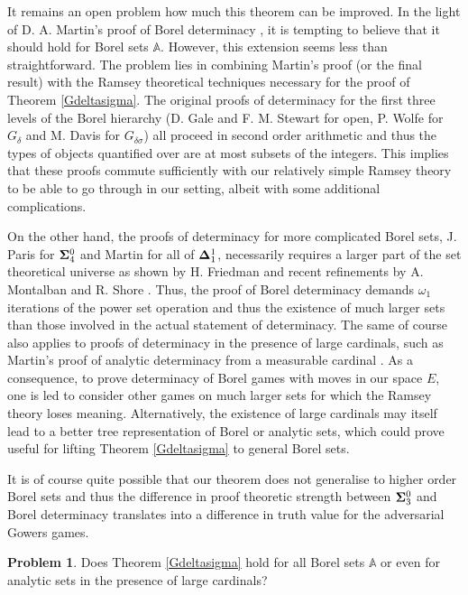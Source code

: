 \documentclass[10pt]{amsart}
\newcommand {\A}{\mathbb A}
\newcommand{\om}{\omega}
\theoremstyle{definition}
\newtheorem{prob}[thm]{Problem}
\begin{document}
It remains an open problem how much  this theorem can be improved. In the light of D. A. Martin's proof of Borel determinacy \cite{martin1,martin2}, it is tempting to believe that it should hold for Borel sets $\A$. However, this extension seems less than straightforward. The problem lies in combining Martin's proof (or the final result) with the Ramsey theoretical techniques necessary for the proof of Theorem \ref{Gdeltasigma}. The original proofs of determinacy for the first three levels of the Borel hierarchy  (D. Gale and F. M. Stewart \cite{gale} for open, P. Wolfe \cite{wolfe} for $G_\delta$ and M. Davis \cite{davis} for $G_{\delta\sigma}$) all proceed in second order arithmetic and thus the types of objects quantified over are at most subsets of the integers. This implies that these proofs commute sufficiently with our relatively simple Ramsey theory to be able to go through in our setting, albeit with some additional complications. 

On the other hand, the proofs of determinacy for more complicated Borel sets, J. Paris \cite{paris} for ${\bf \Sigma}^0_4$ and Martin for all of ${\bf \Delta}^1_1$, necessarily requires  a larger part of the set theoretical universe as shown by H. Friedman \cite{friedman} and recent refinements by A. Montalban and R. Shore \cite{montalban}. Thus, the proof of Borel determinacy demands $\om_1$ iterations of the power set operation and thus the existence of much larger sets than those involved in the actual statement of determinacy. The same of course also applies to proofs of determinacy in the presence of large cardinals, such as Martin's proof of analytic determinacy from a measurable cardinal \cite{martin3}. As a consequence, to prove determinacy of Borel games with moves in our space $E$, one  is led to consider other games on much larger sets for which the Ramsey theory loses meaning. Alternatively, the existence of large cardinals may itself lead to a better tree representation of Borel or analytic sets, which could prove useful for lifting Theorem \ref{Gdeltasigma} to general Borel sets. 


It is of course quite possible that our theorem does not generalise to higher order Borel sets and thus the difference in proof theoretic strength between  ${\bf \Sigma}^0_3$ and Borel determinacy translates into a difference in truth value for the adversarial Gowers games.

\begin{prob}
Does Theorem \ref{Gdeltasigma} hold for all Borel sets $\A$ or even for analytic sets in the presence of large cardinals?
\end{prob}
\end{document}
